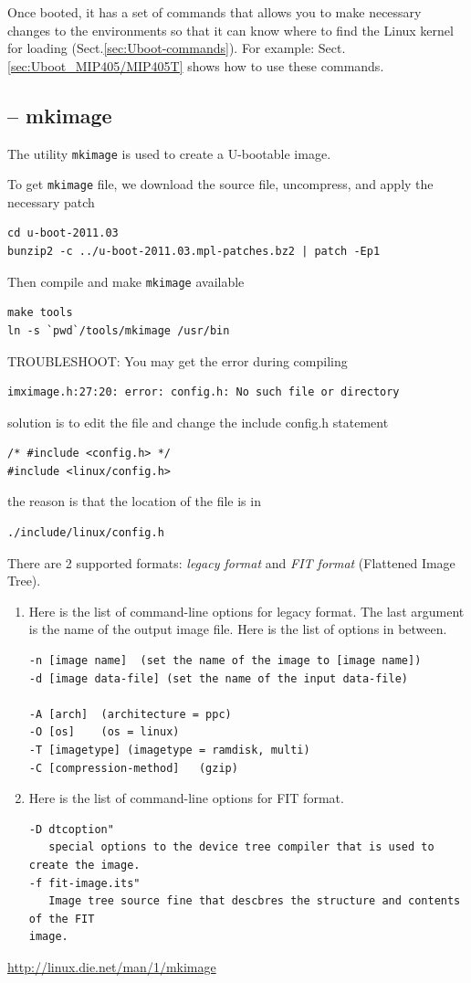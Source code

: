 Once booted, it has a set of commands that allows you to make necessary changes
to the environments so that it can know where to find the Linux kernel for
loading (Sect.\ref{sec:Uboot-commands}). For example:
Sect.\ref{sec:Uboot_MIP405/MIP405T} shows how to use these commands.

\subsection{-- mkimage}
\label{sec:mkimage}

The utility \verb!mkimage! is used to create a U-bootable image.

To get \verb!mkimage! file, we download the source file, uncompress, and apply
the necessary patch 
\begin{verbatim}
cd u-boot-2011.03
bunzip2 -c ../u-boot-2011.03.mpl-patches.bz2 | patch -Ep1
\end{verbatim}
Then compile and make \verb!mkimage! available
\begin{verbatim}
make tools
ln -s `pwd`/tools/mkimage /usr/bin
\end{verbatim}

TROUBLESHOOT: You may get the error during compiling
\begin{verbatim}
imximage.h:27:20: error: config.h: No such file or directory
\end{verbatim}
solution is to edit the file and change the include config.h statement
\begin{verbatim}
/* #include <config.h> */
#include <linux/config.h>
\end{verbatim}
the reason is that the location of the file is in
\begin{verbatim}
./include/linux/config.h
\end{verbatim}

There are 2 supported formats: {\it legacy format} and {\it FIT format}
(Flattened Image Tree). 
\begin{enumerate}
  \item  Here is the list of command-line options for legacy
format. The last argument is the name of the output image file.
Here is the list of options in between.
\begin{verbatim}
-n [image name]  (set the name of the image to [image name])
-d [image data-file] (set the name of the input data-file)

-A [arch]  (architecture = ppc)
-O [os]    (os = linux)
-T [imagetype] (imagetype = ramdisk, multi)
-C [compression-method]   (gzip)

\end{verbatim}
  
  \item Here is the list of command-line options for FIT format.
\begin{verbatim}
-D dtcoption"
   special options to the device tree compiler that is used to create the image.
-f fit-image.its"
   Image tree source fine that descbres the structure and contents of the FIT
image.
\end{verbatim}
\end{enumerate}
\url{http://linux.die.net/man/1/mkimage}

